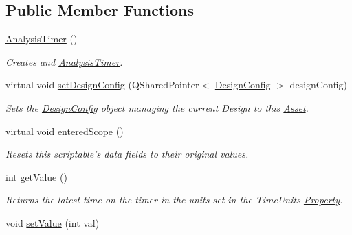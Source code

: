 \subsection*{Public Member Functions}
\begin{DoxyCompactItemize}
\item 
\hyperlink{class_picto_1_1_analysis_timer_a56132a066f92300c554e9a46dd66c5f4}{Analysis\-Timer} ()
\begin{DoxyCompactList}\small\item\em Creates and \hyperlink{class_picto_1_1_analysis_timer}{Analysis\-Timer}. \end{DoxyCompactList}\item 
virtual void \hyperlink{class_picto_1_1_analysis_timer_a8a76727aa775f6a61654d432a2784ef6}{set\-Design\-Config} (Q\-Shared\-Pointer$<$ \hyperlink{class_picto_1_1_design_config}{Design\-Config} $>$ design\-Config)
\begin{DoxyCompactList}\small\item\em Sets the \hyperlink{class_picto_1_1_design_config}{Design\-Config} object managing the current Design to this \hyperlink{class_picto_1_1_asset}{Asset}. \end{DoxyCompactList}\item 
virtual void \hyperlink{class_picto_1_1_analysis_timer_adb5e30561a5c7b72d5370c552d23aafb}{entered\-Scope} ()
\begin{DoxyCompactList}\small\item\em Resets this scriptable's data fields to their original values. \end{DoxyCompactList}\item 
\hypertarget{class_picto_1_1_analysis_timer_a2e404df5cd1d4ad26dc10cdaaaa4beaa}{int \hyperlink{class_picto_1_1_analysis_timer_a2e404df5cd1d4ad26dc10cdaaaa4beaa}{get\-Value} ()}\label{class_picto_1_1_analysis_timer_a2e404df5cd1d4ad26dc10cdaaaa4beaa}

\begin{DoxyCompactList}\small\item\em Returns the latest time on the timer in the units set in the Time\-Units \hyperlink{class_picto_1_1_property}{Property}. \end{DoxyCompactList}\item 
\hypertarget{class_picto_1_1_analysis_timer_a3cc440fc668251db2dd483b8cd8c3551}{void \hyperlink{class_picto_1_1_analysis_timer_a3cc440fc668251db2dd483b8cd8c3551}{set\-Value} (int val)}\label{class_picto_1_1_analysis_timer_a3cc440fc668251db2dd483b8cd8c3551}


\end{DoxyCompactItemize}
